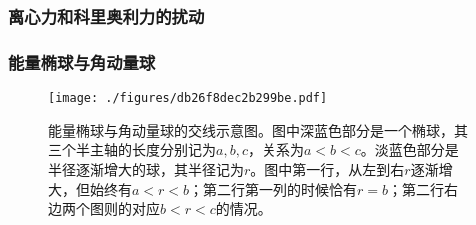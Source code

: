 \subsubsection{离心力和科里奥利力的扰动}







\subsubsection{能量椭球与角动量球}


\begin{figure}[ht]
\centering
\texttt{[image: ./figures/db26f8dec2b299be.pdf]}
\caption{能量椭球与角动量球的交线示意图。图中深蓝色部分是一个椭球，其三个半主轴的长度分别记为$a, b, c$，关系为$a<b<c$。淡蓝色部分是半径逐渐增大的球，其半径记为$r$。图中第一行，从左到右$r$逐渐增大，但始终有$a<r<b$；第二行第一列的时候恰有$r=b$；第二行右边两个图则的对应$b<r<c$的情况。} \label{fig_Dzhani_7}
\end{figure}


















